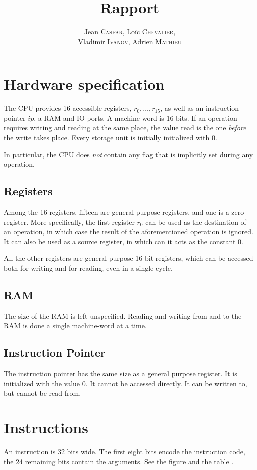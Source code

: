 \documentclass{scrartcl}
\title{Rapport}
\author{%
  Jean \textsc{Caspar},
  Loïc \textsc{Chevalier},\\
  Vladimir \textsc{Ivanov},
  Adrien \textsc{Mathieu}
}
\date{}
\begin{document}
\maketitle{}
\section*{Hardware specification}
The CPU provides 16 accessible registers, \(r_0,\ldots,r_{15}\), as
well as an instruction pointer \(ip\), a RAM and IO ports. A machine
word is 16 bits. If an operation requires writing and reading at the
same place, the value read is the one \emph{before} the write takes
place. Every storage unit is initially initialized with \(0\).\par
In particular, the CPU does \emph{not} contain any flag that is
implicitly set during any operation.
\subsection*{Registers}
Among the 16 registers, fifteen are general purpose registers, and
one is a zero register. More specifically, the first register \(r_0\)
can be used as the destination of an operation, in which case the result
of the aforementioned operation is ignored. It can also be used as a
source register, in which can it acts as the constant \(0\).\par
All the other registers are general purpose 16 bit registers, which
can be accessed both for writing and for reading, even in a single
cycle.
\subsection*{RAM}
The size of the RAM is left unspecified. Reading and writing from and
to the RAM is done a single machine-word at a time.
\subsection*{Instruction Pointer}
The instruction pointer has the same size as a general purpose
register. It is initialized with the value \(0\). It cannot be
accessed directly. It can be written to, but cannot be read from.

\section*{Instructions}
An instruction is 32 bits wide. The first eight bits encode the
instruction code, the 24 remaining bits contain the arguments. See
the figure  and the table .
\end{document}
